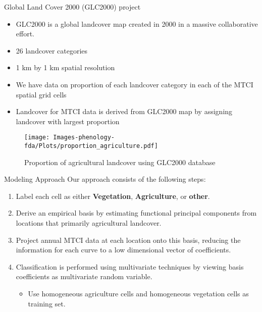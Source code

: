 \documentclass{beamer}
\begin{document}
\begin{frame}[t]{Global Land Cover 2000 (GLC2000) project}
\begin{itemize}
	\item GLC2000 is a global landcover map created in 2000 in a massive collaborative effort.
	\item 26 landcover categories
	\item 1 km by 1 km spatial resolution
	\item We have data on proportion of each landcover category in each of the MTCI spatial grid cells
	\item Landcover for MTCI data is derived from GLC2000 map by assigning landcover with largest proportion
\end{itemize}
		\begin{figure}
		\texttt{[image: Images-phenology-fda/Plots/proportion\_agriculture.pdf]}
		\caption{Proportion of agricultural landcover using GLC2000 database}
		\end{figure}

\end{frame}


\begin{frame}[t]{Modeling Approach}
	 Our approach consists of the following steps:
	\begin{enumerate}
		\item Label each cell as either \textbf{Vegetation}, \textbf{Agriculture}, or \textbf{other}.
		\item Derive an empirical basis by estimating functional principal components from locations that primarily agricultural landcover.
		\item Project annual MTCI data at each location onto this basis, reducing the information for each curve to a low dimensional vector of coefficients.
		\item Classification is performed using multivariate techniques by viewing basis coefficients as multivariate random variable.
		\begin{itemize}
			\item Use homogeneous agriculture cells and homogeneous vegetation cells as training set.
		\end{itemize}
	\end{enumerate}
\end{frame}
\end{document}
